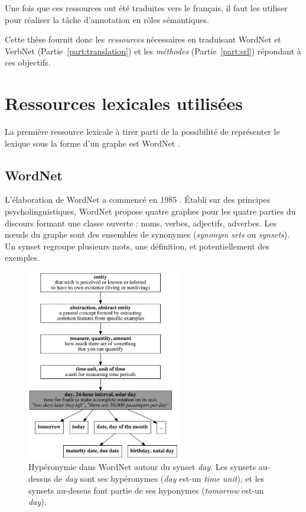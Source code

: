 Une fois que ces ressources ont été traduites vers le français, il faut les
utiliser pour réaliser la tâche d'annotation en rôles sémantiques.

Cette thèse fournit donc les \emph{ressources} nécessaires en traduisant
WordNet et VerbNet (Partie~\ref{part:translation}) et les \emph{méthodes}
(Partie~\ref{part:srl}) répondant à ces objectifs.

\section{Ressources lexicales utilisées}

La première ressource lexicale à tirer parti de la possibilité de représenter
le lexique sous la forme d'un graphe est WordNet \citep{fellbaum1998wordnet}.

\subsection{WordNet}
\label{presentation_wordnet}

L'élaboration de WordNet a commencé en 1985 \citep{miller1990introduction}.
Établi sur des principes psycholinguistiques, WordNet propose quatre graphes
pour les quatre parties du discours formant une classe ouverte : noms, verbes,
adjectifs, adverbes. Les nœuds du graphe sont des ensembles de synonymes
(\emph{synonym sets} ou \emph{synsets}). Un synset regroupe plusieurs mots, une
définition, et potentiellement des exemples.


\begin{figure}[t]
    \centering
    \includegraphics[width=0.6\textwidth]{fig/wordnet_hypernymy.png}
    \caption{\label{fig:wordnet_hypernymy}Hypéronymie dans WordNet autour du
        synset \emph{day}. Les synsets au-dessus de \emph{day} sont ses hypéronymes
        (\emph{day} est-un \emph{time unit}), et les synsets au-dessus font partie de
        ses hyponymes (\emph{tomorrow} est-un \emph{day}).}
\end{figure}

